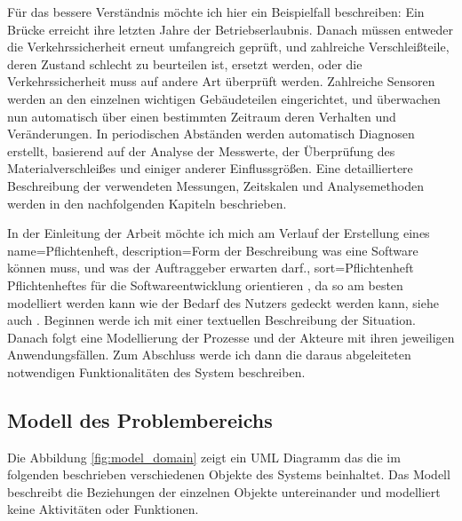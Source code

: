 Für das bessere Verständnis möchte ich hier ein Beispielfall beschreiben: Ein Brücke erreicht ihre letzten Jahre der Betriebserlaubnis. Danach müssen entweder die Verkehrssicherheit erneut umfangreich geprüft, und zahlreiche Verschleißteile, deren Zustand schlecht zu beurteilen ist, ersetzt werden, oder die Verkehrssicherheit muss auf andere Art überprüft werden. Zahlreiche Sensoren werden an den einzelnen wichtigen Gebäudeteilen eingerichtet, und überwachen nun automatisch über einen bestimmten Zeitraum deren Verhalten und Veränderungen. In periodischen Abständen werden automatisch Diagnosen erstellt, basierend auf der Analyse der Messwerte, der Überprüfung des Materialverschleißes und einiger anderer Einflussgrößen. Eine detailliertere Beschreibung der verwendeten Messungen, Zeitskalen und Analysemethoden werden in den nachfolgenden Kapiteln beschrieben.

In der Einleitung der Arbeit möchte ich mich am Verlauf der Erstellung eines 
{
  name={Pflichtenheft},
  description={Form der Beschreibung was eine Software können muss, und was der Auftraggeber erwarten darf.},
  sort=Pflichtenheft
}
\gls{Pflichtenheft}es für die Softwareentwicklung orientieren , da so am besten modelliert werden kann wie der Bedarf des Nutzers gedeckt werden kann, siehe auch \citep{gregor_engels_vorlesung_2006}. Beginnen werde ich mit einer textuellen Beschreibung der Situation. Danach folgt eine Modellierung der Prozesse und der Akteure mit ihren jeweiligen Anwendungsfällen. Zum Abschluss werde ich dann die daraus abgeleiteten notwendigen Funktionalitäten des System beschreiben.


\subsection{Modell des Problembereichs}
Die Abbildung \ref{fig:model_domain} zeigt ein  \gls{UML} Diagramm das die im folgenden beschrieben verschiedenen Objekte des Systems beinhaltet. Das Modell beschreibt die Beziehungen der einzelnen Objekte untereinander und modelliert keine Aktivitäten oder Funktionen.

